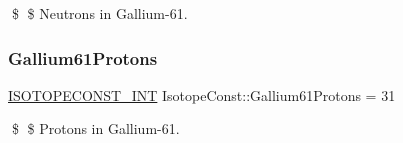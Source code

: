 \$ \$ Neutrons in Gallium-\/61. \mbox{\label{group___isotope_const-_gallium-_ga61_ga0f5566f0b31000b7367f179a85a5ffbc}} 
\subsubsection{\texorpdfstring{Gallium61\+Protons}{Gallium61Protons}}
{\footnotesize\ttfamily \mbox{\hyperlink{group___isotope_const-_macros_ga5f18360b3e99483a35c32d789e62621c}{I\+S\+O\+T\+O\+P\+E\+C\+O\+N\+S\+T\+\_\+\+I\+NT}} Isotope\+Const\+::\+Gallium61\+Protons = 31}

\$ \$ Protons in Gallium-\/61. 